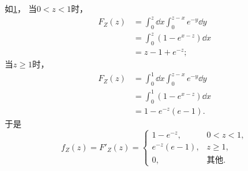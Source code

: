 \begin{example}
\begin{solution}
\begin{figure}
	\caption{}
	\label{figure:多维随机变量及其分布.二维连续型随机变量函数的分布.例2}
\end{figure}
如\cref{figure:多维随机变量及其分布.二维连续型随机变量函数的分布.例2}，
当\(0<z<1\)时，\begin{align*}
	F_Z(z) &= \int_0^z \dd{x} \int_0^{z-x} e^{-y} \dd{y} \\
	&= \int_0^z (1-e^{x-z}) \dd{x} \\
	&= z-1+e^{-z};
\end{align*}
当\(z\geq1\)时，\begin{align*}
	F_Z(z) &= \int_0^1 \dd{x} \int_0^{z-x} e^{-y} \dd{y} \\
	&= \int_0^1 (1-e^{x-z}) \dd{x} \\
	&= 1-e^{-z}(e-1).
\end{align*}
于是\[
	f_Z(z) = F'_Z(z)
	= \begin{cases}
		1 - e^{-z}, & 0<z<1, \\
		e^{-z}(e-1), & z\geq1, \\
		0, & \text{其他}.
	\end{cases}
\]
\end{solution}
\end{example}

